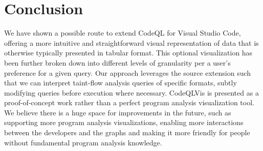 \documentclass[sigplan,10pt,review]{acmart}
\begin{document}
\section{Conclusion}
We have shown a possible route to extend CodeQL for Visual Studio Code, offering a more intuitive and straightforward visual representation of data that is otherwise typically presented in tabular format. This optional visualization has been further broken down into different levels of granularity per a user's preference for a given query. Our approach leverages the source extension such that we can interpret taint-flow analysis queries of specific formats, subtly modifying queries before execution where necessary.
\newline
\indent
CodeQLVis is presented as a proof-of-concept work rather than a perfect program analysis visualization tool. We believe there is a huge space for improvements in the future, such as supporting more program analysis visualizations, enabling more interactions between the developers and the graphs and making it more friendly for people without fundamental program analysis knowledge. 


\end{document}
